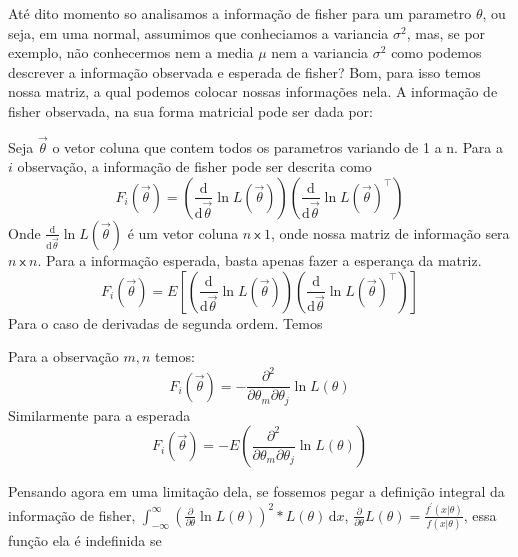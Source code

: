 Até dito momento so analisamos a informação de fisher para um parametro \(\theta \), ou seja, em uma
normal, assumimos que conheciamos a variancia \(\sigma^{2} \), mas, se por exemplo, não conhecermos
nem a media \(\mu \) nem a variancia \(\sigma^{2} \) como podemos descrever a informação observada e
esperada de fisher? Bom, para isso temos nossa matriz, a qual podemos colocar nossas informações
nela. A informação de fisher observada, na sua forma matricial pode ser dada por: \par
Seja \(\vec{\theta} \) o vetor coluna que contem todos os parametros variando de 1 a n. Para a \(i\)
observação, a informação de fisher pode ser descrita como
\begin{equation}\label{eq:informacao de fisher observada matricial}
    F_i(\vec{\theta})=(\frac{\mathrm{d}}{\mathrm{d}\vec{\theta} } \ln L(\vec{\theta}))
    (\frac{\mathrm{d}}{\mathrm{d}\vec{\theta} } \ln L(\vec{\theta})^{\top})
\end{equation}
Onde \(\frac{\mathrm{d}}{\mathrm{d}\vec{\theta} } \ln L(\vec{\theta})\) é um vetor coluna \(n \
\mathsf{x} \ 1\), onde nossa matriz de informação sera \(n \ \mathsf{x} \ n\). Para a informação
esperada, basta apenas fazer a esperança da matriz.
\begin{equation}\label{eq:informacao de fisher esperada matricial}
    F_i(\vec{\theta})=E[(\frac{\mathrm{d}}{\mathrm{d}\vec{\theta} } \ln L(\vec{\theta}))
    (\frac{\mathrm{d}}{\mathrm{d}\vec{\theta} } \ln L(\vec{\theta})^{\top})]
\end{equation}
Para o caso de derivadas de segunda ordem. Temos \par
Para a observação \(m,n\) temos:
\begin{equation}\label{eq:informacao de fisher observada matricial segunda ordem}
    F_i(\vec{\theta})=-\frac{\partial^{2} }{\partial \theta_m \partial\theta_j} \ln L(\theta )
\end{equation}
Similarmente para a esperada
\begin{equation}\label{eq:informacao de fisher esperada matricial segunda ordem}
    F_i(\vec{\theta})=-E(\frac{\partial^{2} }{\partial \theta_m \partial\theta_j} \ln L(\theta))
\end{equation}
\par
Pensando agora em uma limitação dela, se fossemos pegar a definição integral da informação de
fisher, \(\int_{-\infty}^{\infty} (\frac{\partial }{\partial \theta } \ln L(\theta ))^{2}*L(\theta )  \,\mathrm{d}x \),
\(\frac{\partial }{\partial \theta }L(\theta )= \frac{f^\prime (x|\theta )}{f(x|\theta)}\), essa função ela é indefinida se
